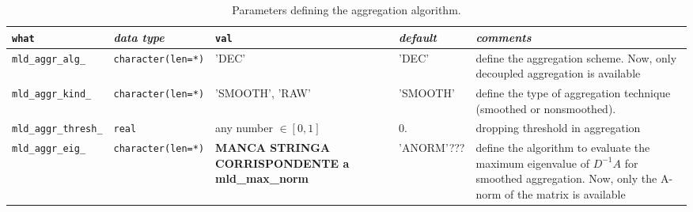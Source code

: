 \begin{sidewaystable}
\begin{center}
\begin{tabular}{|l|l|p{2cm}|l|p{7cm}|}
\hline
\verb|what|              & \emph{data type}        &  \verb|val|      &  \emph{default}  &
\emph{comments} \\ \hline
\verb|mld_aggr_alg_|     & \verb|character(len=*)|
                         & 'DEC'
                         & 'DEC'
                         & define the aggregation scheme. Now, only decoupled aggregation is available\\
\verb|mld_aggr_kind_|    & \verb|character(len=*)|
                         & 'SMOOTH', 'RAW'
                         & 'SMOOTH'
                         & define the type of aggregation technique (smoothed or nonsmoothed).    \\
\verb|mld_aggr_thresh_|  & \verb|real|
                         & any number $\in [0, 1]$
                         & 0.
                         & dropping threshold in aggregation    \\
\verb|mld_aggr_eig_|     & \verb|character(len=*)|
                         & \textbf{MANCA STRINGA CORRISPONDENTE a mld\_max\_norm}
                         & 'ANORM'???
                         & define the algorithm to evaluate the maximum eigenvalue of $D^{-1}A$ for smoothed
aggregation. Now, only the A-norm of the matrix is available\\
\hline
\end{tabular}
\end{center}
\caption{Parameters defining the aggregation algorithm.
\label{tab:p_aggregation}} 
\end{sidewaystable}
                     
